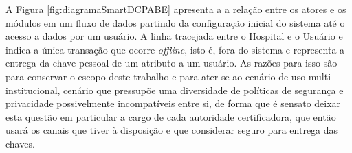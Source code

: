 \documentclass[a4paper,11pt]{article}
\begin{document}

A Figura \ref{fig:diagramaSmartDCPABE} apresenta a a relação entre os atores e os módulos em um fluxo de dados partindo da configuração inicial do sistema até o acesso a dados por um usuário.
A linha tracejada entre o Hospital e o Usuário e indica a única transação que ocorre \emph{offline}, isto é, fora do sistema e representa a entrega da chave pessoal de um atributo a um usuário.
As razões para isso são para conservar o escopo deste trabalho e para ater-se ao cenário de uso multi-institucional, cenário que pressupõe uma diversidade de políticas de segurança e privacidade possivelmente incompatíveis entre si, de forma que é sensato deixar esta questão em particular a cargo de cada autoridade certificadora, que então usará os canais que tiver à disposição e que considerar seguro para entrega das chaves.
\end{document}
